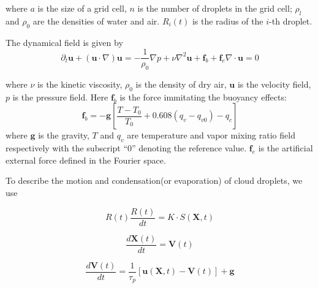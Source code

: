 where $a$ is the size of a grid cell, $n$ is the number of droplets
in the grid cell; $\rho_{l}$ and $\rho_{0}$ are the densities of water
and air. $R_{i}(t)$ is the radius of the $i$-th droplet.

The dynamical field is given by
\begin{subequations}

\begin{equation}
\partial_{t}\mathbf{u}+(\mathbf{u}\cdot\nabla)\mathbf{u}=-\frac{1}{\rho_{0}}\nabla p+\nu\nabla^2 \mathbf{u}+\mathbf{f}_b + \mathbf{f}_e\label{eq:NS1}
\end{equation}


\begin{equation}
\nabla\cdot \mathbf{u}=0\label{eq:NS2}
\end{equation}

\end{subequations}

where $\nu$ is the kinetic viscosity, $\rho_{0}$ is the density of
dry air, $\mathbf{u}$ is the velocity field, $p$ is the pressure field. Here $\mathbf{f}_b$ is the force immitating the buoyancy effects:
\begin{equation}
\mathbf{f}_b= 
-\mathbf{g}[\frac{T-T_{0}}{T_0}+0.608(q_{v}-q_{v0})-q_{c}]
\label{eq:source_term}
\end{equation}
where $\mathbf{g}$ is the gravity, $T$ and $q_{v}$ are temperature
and vapor mixing ratio field respectively with the subscript ``$0$''
denoting the reference value. $\mathbf{f}_e$ is the artificial external force defined in the Fourier space.

To describe the motion and condensation(or evaporation) of cloud droplets, we use

\begin{equation}
R(t)\frac{R(t)}{dt}=K\cdot S(\mathbf{X},t)\label{eq:Radius}
\end{equation}


\begin{equation}
\frac{d\mathbf{X}(t)}{dt}=\mathbf{V}(t)\label{eq:Coords}
\end{equation}


\begin{equation}
\frac{d\mathbf{V}(t)}{dt}=\frac{1}{\tau_{p}}[\mathbf{u}(\mathbf{X},t)-\mathbf{V}(t)]+\mathbf{g}\label{eq:Velocity}
\end{equation}

